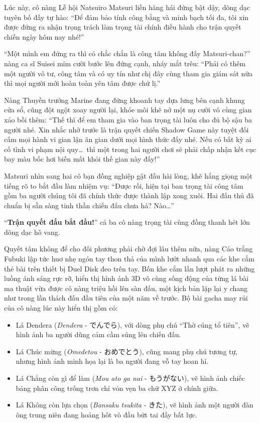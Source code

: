 \documentclass[../main.tex]{subfiles}
\begin{document}
Lúc này, cô nàng Lễ hội Natsuiro Matsuri liền hăng hái đứng bật dậy, dõng dạc tuyên bố đầy tự hào: ``Để đảm bảo tính công bằng và minh bạch tối đa, tôi xin được đứng ra nhận trọng trách làm trọng tài chính điều hành cho trận quyết chiến ngày hôm nay nhé!''

``Một mình em đứng ra thì có chắc chắn là công tâm không đấy Matsuri-chan?'' nàng ca sĩ Suisei mỉm cười bước lên đứng cạnh, nháy mắt trêu: ``Phải có thêm một người vô tư, công tâm và có uy tín như chị đây cùng tham gia giám sát nữa thì mọi người mới hoàn toàn yên tâm được chứ lị.''

Nàng Thuyền trưởng Marine đang đứng khoanh tay dựa lưng bên cạnh khung cửa sổ, cũng đột ngột xoay người lại, khóe môi khẽ nở một nụ cười vô cùng gian xảo bồi thêm: ``Thế thì để em tham gia vào ban trọng tài luôn cho đủ bộ sậu ba người nhé. Xin nhắc nhở trước là trận quyết chiến Shadow Game này tuyệt đối cấm mọi hành vi gian lận ăn gian dưới mọi hình thức đấy nhé. Nếu có bất kỳ ai cố tình vi phạm nội quy\dots\ thì một trong hai người chơi sẽ phải chấp nhận kết cục bay màu bốc hơi biến mất khỏi thế gian này đấy!''

Matsuri nhìn sang hai cô bạn đồng nghiệp gật đầu hài lòng, khẽ hắng giọng một tiếng rõ to bắt đầu làm nhiệm vụ: ``Được rồi, hiện tại ban trọng tài công tâm gồm ba người chúng tôi đã chính thức được thành lập xong xuôi. Hai đấu thủ đã chuẩn bị sẵn sàng tinh thần chiến đấu chưa hả? Nào\dots''

``\textbf{Trận quyết đấu bắt đầu!}'' cả ba cô nàng trọng tài cùng đồng thanh hét lớn dõng dạc hô vang.

\ct

Quyết tâm không để cho đối phương phải chờ đợi lâu thêm nữa, nàng Cáo trắng Fubuki lập tức huơ nhẹ ngón tay thon thả của mình lướt nhanh qua các khe cắm thẻ bài trên thiết bị Duel Disk đeo trên tay. Bốn khe cắm lần lượt phát ra những luồng ánh sáng rực rỡ, hiển thị hình ảnh 3D vô cùng sống động của từng lá bài ma thuật vừa được cô nàng triệu hồi lên sàn đấu, một kịch bản lặp lại y chang như trong lần thách đấu đầu tiên của một năm về trước. Bộ bài gacha may rủi của cô nàng lúc này hiển thị gồm có:

\begin{itemize}
  \item Lá Dendera (\textit{Dendera} - でんでら), với dòng phụ chú ``Thờ cúng tổ tiên'', vẽ hình ảnh ba người dũng cảm cầm súng lên chiến đấu.
  \item Lá Chúc mừng (\textit{Omedetou} - おめでとう), cũng mang phụ chú tương tự, nhưng hình ảnh minh họa lại là ba người đang vỗ tay hoan hỉ.
  \item Lá Chẳng còn gì để làm (\textit{Mou ato ga nai} - もうがない), vẽ hình ảnh chiếc bảng phân công trống trơn chỉ vỏn vẹn ba chữ XYZ ở chính giữa.
  \item Lá Không còn lựa chọn (\textit{Bansaku tsukita} - きた), vẽ hình ảnh một người đàn ông trung niên đang hoảng hốt vò đầu bứt tai đầy bất lực.
\end{itemize}
\end{document}
